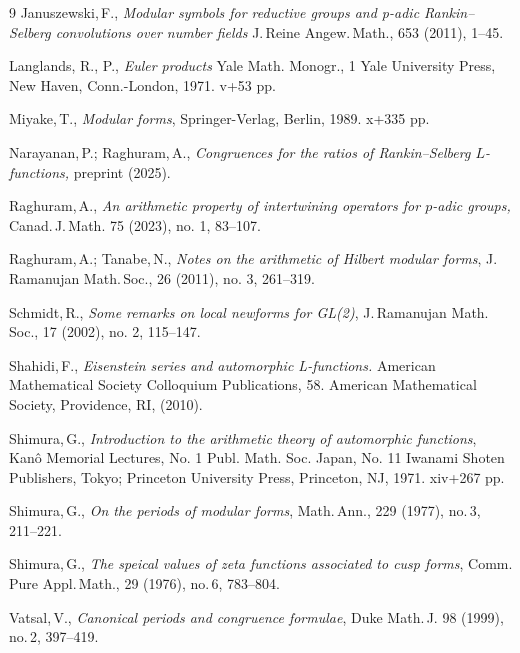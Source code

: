\begin{thebibliography}{9}
 \smallskip	
{} 
{\sc Januszewski,\,F.,} 
\textit{Modular symbols for reductive groups and p-adic Rankin--Selberg convolutions over number fields}
J.\,Reine Angew.\,Math.,  653 (2011), 1--45.

\smallskip
{}
{\sc Langlands, R., P.,}
\textit{Euler products}
Yale Math. Monogr., 1
Yale University Press, New Haven, Conn.-London, 1971. v+53 pp.


 \smallskip
{} 
{\sc Miyake,\,T.,}
\textit{Modular forms}, Springer-Verlag, Berlin, 1989. x+335 pp.
	
 \smallskip	
{} 
{\sc Narayanan,\,P.; Raghuram,\,A.,}
\textit{Congruences for the ratios of Rankin--Selberg $L$-functions,} preprint (2025).
		
 \smallskip
{\sc Raghuram,\,A.,}
 {\it An arithmetic property of intertwining operators for  $p$-adic groups,}
Canad.\,J.\,Math. 75 (2023), no. 1, 83--107.

 \smallskip
{} 
{\sc Raghuram,\,A.; Tanabe,\,N.,}
\textit{Notes on the arithmetic of Hilbert modular forms},
J.\,Ramanujan Math.\,Soc., 26 (2011), no. 3, 261--319.
		
 \smallskip	
{} 
{\sc Schmidt,\,R.,} 
\textit{Some remarks on local newforms for GL(2)},
J.\,Ramanujan Math.\,Soc., 17 (2002), no. 2, 115--147.


\smallskip
{}
{\sc Shahidi,\,F.,}
{\it Eisenstein series and automorphic L-functions.} 
American Mathematical Society Colloquium Publications, 58. 
American Mathematical Society, Providence, RI, (2010). 


 \smallskip		
{} 
{\sc Shimura,\,G.,}
\textit{Introduction to the arithmetic theory of automorphic functions}, 
Kanô Memorial Lectures, No. 1
Publ. Math. Soc. Japan, No. 11
Iwanami Shoten Publishers, Tokyo; Princeton University Press, Princeton, NJ, 1971. xiv+267 pp.

 \smallskip		
{} 
{\sc Shimura,\,G.,} 
\textit{On the periods of modular forms},
Math.\,Ann., 229 (1977), no.\,3, 211--221.
	
 \smallskip	
{} 
{\sc Shimura,\,G.,} 
\textit{The speical values of zeta functions associated to cusp forms}, 
Comm. Pure Appl.\,Math., 29 (1976), no.\,6, 783--804.
	
 \smallskip	
{} 
{\sc Vatsal,\,V.,}
\textit{Canonical periods and congruence formulae}, 
Duke Math.\,J. 98 (1999), no.\,2, 397--419.		

\end{thebibliography}
